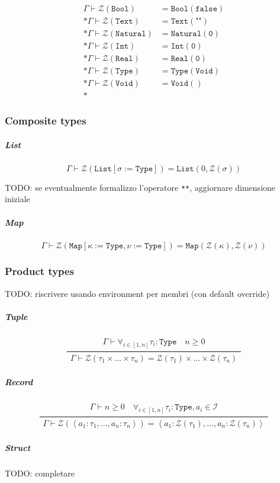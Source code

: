 \documentclass[11pt]{report}
\newcommand{\infrule}[3][gathered]{\frac{\begin{#1}#2\end{#1}}{\begin{gathered}#3\end{gathered}}}
\newcommand{\then}{\vdash}
\newcommand{\tuple}[1]{\left<#1\right>}
\newcommand{\code}[1]{\texttt{\colorbox{gray!10}{#1}}}
\newcommand{\Id}{\mathcal{I}}
\newcommand{\Zero}{\mathcal{Z}}
\newcommand{\Type}{\texttt{Type}}
\newcommand{\Bool}{\texttt{Bool}}
\newcommand{\Text}{\texttt{Text}}
\newcommand{\Void}{\texttt{Void}}
\newcommand{\Int}{\texttt{Int}}
\newcommand{\Natural}{\texttt{Natural}}
\newcommand{\Real}{\texttt{Real}}
\newcommand{\List}{\texttt{List}}
\newcommand{\Map}{\texttt{Map}}
\newcommand{\Env}{\Gamma}
\theoremstyle{definition}
\newcommand{\comment}[1]{
	\parbox{0.9\linewidth}{\color{black!30}\small\sffamily #1}
}
\begin{document}
\[
	\begin{split}
		\Env\then \Zero(\Bool)    &= \Bool(\texttt{false}) \\*
		\Env\then \Zero(\Text)    &= \Text(\texttt{""}) \\*
		\Env\then \Zero(\Natural) &= \Natural(\texttt{0}) \\*
		\Env\then \Zero(\Int)     &= \Int(\texttt{0}) \\*
		\Env\then \Zero(\Real)    &= \Real(\texttt{0}) \\*
		\Env\then \Zero(\Type)    &= \Type(\Void) \\*
		\Env\then \Zero(\Void)    &= \Void() \\*
	\end{split}
\]

\subsubsection{Composite types}

\subparagraph{List}

\[
	\Env\then \Zero(\List[\sigma:=\Type]) = \List(0, \Zero(\sigma))
\]

\comment{TODO: se eventualmente formalizzo l'operatore \code{**}, aggiornare
dimensione iniziale}

\subparagraph{Map}

\[
	\Env\then \Zero(\Map[\kappa:=\Type,\nu:=\Type]) = \Map(\Zero(\kappa), \Zero(\nu))
\]

\subsubsection{Product types}

\comment{TODO: riscrivere usando environment per membri (con default override)}

\subparagraph{Tuple}

\[
	\infrule{
		\Env\then \forall_{i\in[1,n]}{\tau_i:\Type} \quad n \geq 0
	}{
		\Env\then \Zero(\tau_1 \times ... \times \tau_n) = \Zero(\tau_1) \times ... \times \Zero(\tau_n)
	}
\]

\subparagraph{Record}

\[
	\infrule{
		\Env\then n \geq 0 \quad \forall_{i\in[1,n]}{\tau_i:\Type, a_i \in \Id}
	}{
		\Env\then \Zero(\tuple{a_1:\tau_1,...,a_n:\tau_n}) = \tuple{a_1:\Zero(\tau_1), ..., a_n:\Zero(\tau_n)}
	}
\]

\subparagraph{Struct}

\text{}

\comment{TODO: completare}
\end{document}
